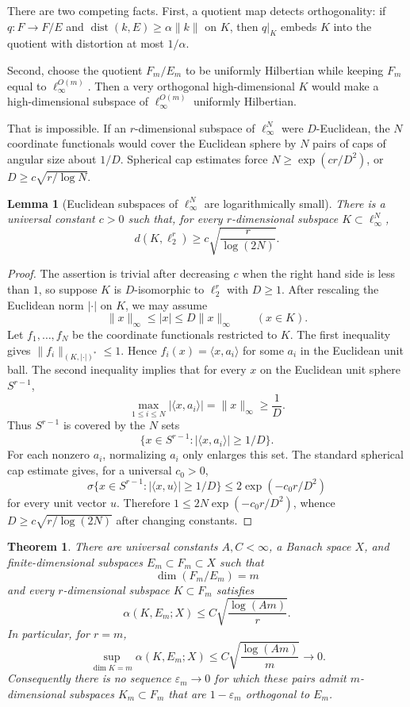 \documentclass[11pt]{article}
\newtheorem{theorem}{Theorem}
\newtheorem{lemma}{Lemma}
\newcommand{\eps}{\varepsilon}
\newcommand{\dist}{\operatorname{dist}}
\begin{document}
There are two competing facts.  First, a quotient map detects orthogonality:
if $q:F\to F/E$ and $\dist(k,E)\ge \alpha\|k\|$ on $K$, then $q|_K$ embeds
$K$ into the quotient with distortion at most $1/\alpha$.

Second, choose the quotient $F_m/E_m$ to be uniformly Hilbertian while keeping
$F_m$ equal to $\ell_\infty^{O(m)}$.  Then a very orthogonal
high-dimensional $K$ would make a high-dimensional subspace of
$\ell_\infty^{O(m)}$ uniformly Hilbertian.

That is impossible.  If an $r$-dimensional subspace of $\ell_\infty^N$ were
$D$-Euclidean, the $N$ coordinate functionals would cover the Euclidean sphere
by $N$ pairs of caps of angular size about $1/D$.  Spherical cap estimates
force $N\ge \exp(c r/D^2)$, or $D\ge c\sqrt{r/\log N}$.

\begin{lemma}[Euclidean subspaces of $\ell_\infty^N$ are logarithmically small]
\label{lem:linfty}
There is a universal constant $c>0$ such that, for every
$r$-dimensional subspace $K\subset \ell_\infty^N$,
\[
  d(K,\ell_2^r)\ge c\sqrt{\frac{r}{\log(2N)}}.
\]
\end{lemma}

\begin{proof}
The assertion is trivial after decreasing $c$ when the right hand side is
less than $1$, so suppose $K$ is $D$-isomorphic to $\ell_2^r$ with $D\ge 1$.
After rescaling the Euclidean norm $|\cdot|$ on $K$, we may assume
\[
  \|x\|_\infty \le |x| \le D\|x\|_\infty\qquad (x\in K).
\]
Let $f_1,\dots,f_N$ be the coordinate functionals restricted to $K$.  The
first inequality gives $\|f_i\|_{(K,|\cdot|)^*}\le 1$.  Hence
$f_i(x)=\langle x,a_i\rangle$ for some $a_i$ in the Euclidean unit ball.
The second inequality implies that for every $x$ on the Euclidean unit sphere
$S^{r-1}$,
\[
  \max_{1\le i\le N} |\langle x,a_i\rangle|
  =\|x\|_\infty \ge \frac{1}{D}.
\]
Thus $S^{r-1}$ is covered by the $N$ sets
\[
  \{x\in S^{r-1}: |\langle x,a_i\rangle|\ge 1/D\}.
\]
For each nonzero $a_i$, normalizing $a_i$ only enlarges this set.  The
standard spherical cap estimate gives, for a universal $c_0>0$,
\[
  \sigma\{x\in S^{r-1}: |\langle x,u\rangle|\ge 1/D\}
  \le 2\exp(-c_0 r/D^2)
\]
for every unit vector $u$.  Therefore
$1\le 2N\exp(-c_0 r/D^2)$, whence
$D\ge c\sqrt{r/\log(2N)}$ after changing constants.
\end{proof}

\begin{theorem}
\label{thm:main}
There are universal constants $A,C<\infty$, a Banach space $X$, and
finite-dimensional subspaces $E_m\subset F_m\subset X$ such that
\[
  \dim(F_m/E_m)=m
\]
and every $r$-dimensional subspace $K\subset F_m$ satisfies
\[
  \alpha(K,E_m;X)\le C\sqrt{\frac{\log(Am)}{r}}.
\]
In particular, for $r=m$,
\[
  \sup_{\dim K=m}\alpha(K,E_m;X)
  \le C\sqrt{\frac{\log(Am)}{m}}\longrightarrow 0.
\]
Consequently there is no sequence $\eps_m\to 0$ for which these pairs admit
$m$-dimensional subspaces $K_m\subset F_m$ that are $1-\eps_m$ orthogonal to
$E_m$.
\end{theorem}
\end{document}
